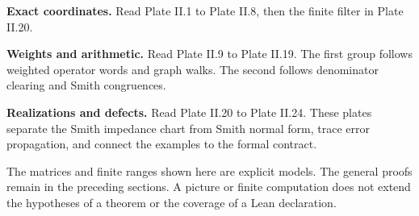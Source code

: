 \documentclass[11pt,a4paper]{article}
\theoremstyle{definition}
\theoremstyle{remark}
\theoremstyle{definition}\newtheorem{construction}[theorem]{Construction}\newtheorem{certificate}[theorem]{Numerical Certificate}
\theoremstyle{remark}\newtheorem{boundary}[theorem]{Boundary}
\begin{document}
\begin{readerroadmap}[title={Three routes through the atlas}]
\textbf{Exact coordinates.} Read Plate II.1 to Plate II.8, then the finite filter in Plate II.20.

\textbf{Weights and arithmetic.} Read Plate II.9 to Plate II.19. The first group follows weighted operator words and graph walks. The second follows denominator clearing and Smith congruences.

\textbf{Realizations and defects.} Read Plate II.20 to Plate II.24. These plates separate the Smith impedance chart from Smith normal form, trace error propagation, and connect the examples to the formal contract.
\end{readerroadmap}
The matrices and finite ranges shown here are explicit models. The general proofs remain in the preceding sections. A picture or finite computation does not extend the hypotheses of a theorem or the coverage of a Lean declaration.
\clearpage
\begingroup
{}\fontsize{10}{12}\selectfont\setlength{\parskip}{3pt}\setlength{\abovedisplayskip}{6pt}\setlength{\belowdisplayskip}{6pt}

\endgroup
\clearpage

\end{document}
